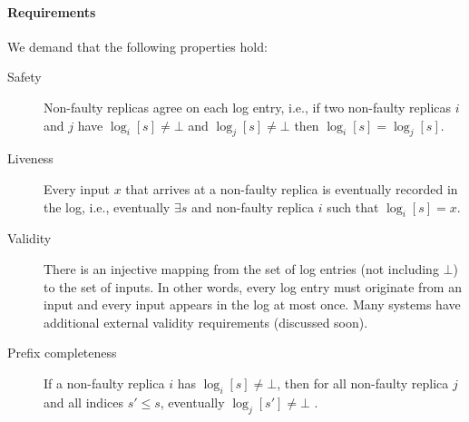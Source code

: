 \paragraph{Requirements}
We demand that the following properties hold:
\begin{description}
    \item[Safety] Non-faulty replicas agree on 
    each log entry, i.e., if two non-faulty replicas $i$ and $j$ have 
    $\log_i[s] \ne\bot$ and $\log_j[s]\ne\bot$ then $\log_i[s] = \log_j[s]$.

    \item[Liveness] Every input $x$ that arrives at 
    a non-faulty replica is eventually recorded in the log,
     i.e., eventually $\exists s$ and non-faulty replica $i$ such that $\log_i[s]=x$.

    \item[Validity] There is an injective mapping from the set of 
    log entries (not including $\bot$) to the set of inputs.
    In other words, every log entry must originate from an input and 
    every input appears in the log at most once. 
    Many systems have additional external validity requirements (discussed soon).

    \item[Prefix completeness]
    If a non-faulty replica $i$ has $\log_i[s] \ne\bot$,
    then for all non-faulty replica $j$ and all indices $s'\le s$,
    eventually $\log_j[s'] \ne\bot$ .

\end{description}








